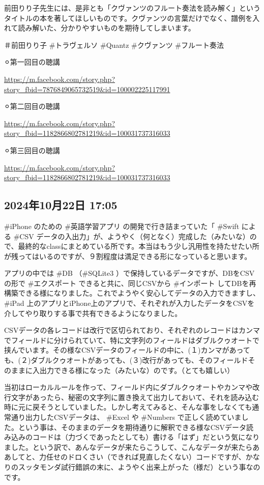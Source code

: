 \documentclass[facebook_diary.tex]{subfiles}
\begin{document}
前田りり子先生には、是非とも「クヴァンツのフルート奏法を読み解く」というタイトルの本を著してほしいものです。クヴァンツの言葉だけでなく、譜例を入れて読み解いた、分かりやすいものを期待してしまいます。


＃前田りり子 \#トラヴェルソ \#Quantz \#クヴァンツ \#フルート奏法


⚪︎第一回目の聴講

\url{https://m.facebook.com/story.php?story_fbid=7876849065732519&id=100002225117991}




⚪︎第二回目の聴講

\url{https://m.facebook.com/story.php?story_fbid=1182866802781219&id=100031737316033}




⚪︎第三回目の聴講

\url{https://m.facebook.com/story.php?story_fbid=1182866802781219&id=100031737316033}



\subsection*{2024年10月22日 17:05}

\#iPhone のための \#英語学習アプリ の開発で行き詰まっていた「 \#Swift による \#CSV データの入出力」が、ようやく（何となく）完成した（みたいな）ので、最終的なclassにまとめている所です。本当はもう少し汎用性を持たせたい所が残ってはいるのですが、９割程度は満足できる形になっていると思います。


アプリの中では \#DB （\#SQLite3 ）で保持しているデータですが、DBをCSVの形で \#エクスポート できると共に、同じCSVから \#インポート してDBを再構築できる様になりました。これでようやく安心してデータの入力できますし、 \#iPad 上のアプリとiPhone上のアプリで、それぞれが入力したデータをCSVを介してやり取りする事で共有できるようになりました。


CSVデータの各レコードは改行で区切られており、それぞれのレコードはカンマでフィールドに分けられていて、特に文字列のフィールドはダブルクゥオートで挟んでいます。その様なCSVデータのフィールドの中に、(１)カンマがあっても、(２)ダブルクゥオートがあっても、(３)改行があっても、そのフィールドそのままに入出力できる様になった（みたいな）のです。（とても嬉しい）


当初はローカルルールを作って、フィールド内にダブルクゥオートやカンマや改行文字があったら、秘密の文字列に置き換えて出力しておいて、それを読み込む時に元に戻そうとしていました。しかし考えてみると、そんな事をしなくても通常通り出力したCSVデータは、 \#Excel や \#Numbers で正しく読めていました。という事は、そのままのデータを期待通りに解釈できる様なCSVデータ読み込みのコードは（力づくであったとしても）書ける「はず」だという気になりました。という訳で、あんなデータが来たらこうして、こんなデータが来たらああしてと、力任せのドロくさい（できれば見直したくない）コードですが、かなりのスッタモンダ試行錯誤の末に、ようやく出来上がった（様だ）という事なのです。
\end{document}
